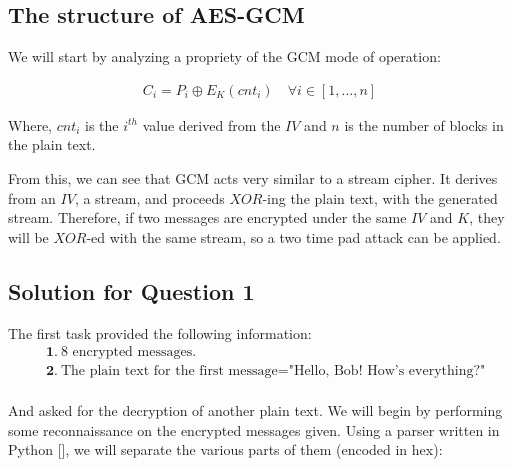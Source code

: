 \documentclass[11pt]{llncs}
\begin{document}
\subsection{The structure of AES-GCM}
We will start by analyzing a propriety of the GCM mode of operation:

\[ \begin{aligned}
C_i = P_i \oplus E_K(cnt_i) \quad \forall i \in [1,\dots,n]
\end{aligned} \]

Where, $cnt_i$ is the $i^{th}$ value derived from the $IV$ and $n$ is the number of blocks in the plain text.

From this, we can see that GCM acts very similar to a stream cipher. It derives from an $IV$, a stream, and proceeds $XOR$-ing the plain text, with the generated stream. Therefore, if two messages are encrypted under the same $IV$ and $K$, they will be $XOR$-ed with the same stream, so a two time pad attack can be applied.

\subsection{Solution for Question 1}
The first task provided the following information:
\[ \begin{aligned}
& \textbf{1.}\ \text{8 encrypted messages.} \\
& \textbf{2.}\ \text{The plain text for the first message} = \text{"Hello, Bob! How's everything?"} \\
\end{aligned}\]

And asked for the decryption of another plain text. We will begin by performing some reconnaissance on the encrypted messages given. Using a parser written in Python [], we will separate the various parts of them (encoded in hex):
\end{document}
